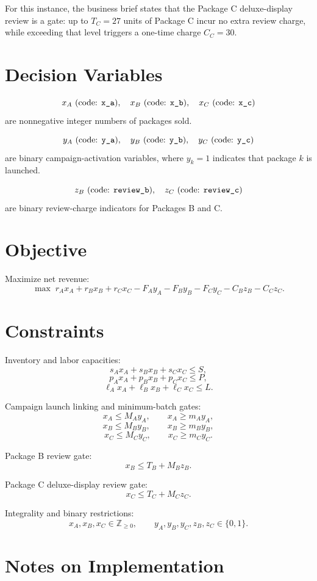 For this instance, the business brief states that the Package C deluxe-display review is a gate: up to \(T_C=27\) units of Package C incur no extra review charge, while exceeding that level triggers a one-time charge \(C_C=30\).

\section*{Decision Variables}

\[
x_A \text{ (code: \texttt{x\_a})},\quad
x_B \text{ (code: \texttt{x\_b})},\quad
x_C \text{ (code: \texttt{x\_c})}
\]
are nonnegative integer numbers of packages sold.

\[
y_A \text{ (code: \texttt{y\_a})},\quad
y_B \text{ (code: \texttt{y\_b})},\quad
y_C \text{ (code: \texttt{y\_c})}
\]
are binary campaign-activation variables, where \(y_k=1\) indicates that package \(k\) is launched.

\[
z_B \text{ (code: \texttt{review\_b})},\quad
z_C \text{ (code: \texttt{review\_c})}
\]
are binary review-charge indicators for Packages B and C.

\section*{Objective}

Maximize net revenue:
\[
\max \;
r_A x_A + r_B x_B + r_C x_C
- F_A y_A - F_B y_B - F_C y_C
- C_B z_B - C_C z_C .
\]

\section*{Constraints}

Inventory and labor capacities:
\[
s_A x_A + s_B x_B + s_C x_C \le S,
\]
\[
p_A x_A + p_B x_B + p_C x_C \le P,
\]
\[
\ell_A x_A + \ell_B x_B + \ell_C x_C \le L.
\]

Campaign launch linking and minimum-batch gates:
\[
x_A \le M_A y_A,\qquad x_A \ge m_A y_A,
\]
\[
x_B \le M_B y_B,\qquad x_B \ge m_B y_B,
\]
\[
x_C \le M_C y_C,\qquad x_C \ge m_C y_C.
\]

Package B review gate:
\[
x_B \le T_B + M_B z_B.
\]

Package C deluxe-display review gate:
\[
x_C \le T_C + M_C z_C.
\]

Integrality and binary restrictions:
\[
x_A,x_B,x_C \in \mathbb{Z}_{\ge 0},
\qquad
y_A,y_B,y_C,z_B,z_C \in \{0,1\}.
\]

\section*{Notes on Implementation}

